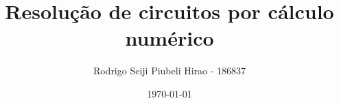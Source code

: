 \title{Resolução de circuitos por cálculo numérico}
\author{
    Rodrigo Seiji Piubeli Hirao - 186837
}
\date{\today}